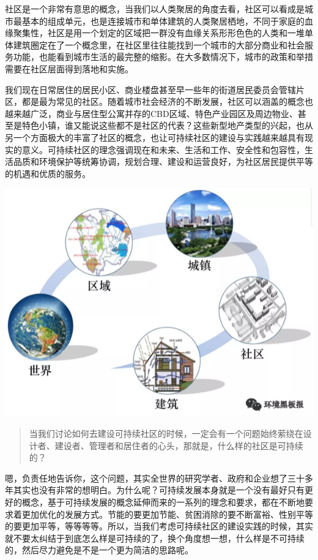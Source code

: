 \documentclass[]{book}
\begin{document}
社区是一个非常有意思的概念，当我们以人类聚居的角度去看，社区可以看成是城市最基本的组成单元，也是连接城市和单体建筑的人类聚居栖地，不同于家庭的血缘聚集性，社区是用一个划定的区域把一群没有血缘关系形形色色的人类和一堆单体建筑圈定在了一个概念里，在社区里往往能找到一个城市的大部分商业和社会服务功能，也能看到城市生活的最完整的缩影。在大多数情况下，城市的政策和举措需要在社区层面得到落地和实施。

我们现在日常居住的居民小区、商业楼盘甚至早一些年的街道居民委员会管辖片区，都是最为常见的社区。随着城市社会经济的不断发展，社区可以涵盖的概念也越来越广泛，商业与居住型公寓并存的CBD区域、特色产业园区及周边物业、甚至是特色小镇，谁又能说这些都不是社区的代表？这些新型地产类型的兴起，也从另一个方面极大的丰富了社区的概念，也让可持续社区的建设与实践越来越具有现实的意义。可持续社区的理念强调现在和未来、生活和工作、安全性和包容性，生活品质和环境保护等统筹协调，规划合理、建设和运营良好，为社区居民提供平等的机遇和优质的服务。

\includegraphics[width=8.33in]{images/moma2}

\begin{quote}
当我们讨论如何去建设可持续社区的时候，一定会有一个问题始终萦绕在设计者、建设者、管理者和居住者的心头，那就是，什么样的社区是可持续的？
\end{quote}

嗯，负责任地告诉你，这个问题，其实全世界的研究学者、政府和企业想了三十多年其实也没有非常的想明白。为什么呢？可持续发展本身就是一个没有最好只有更好的概念，基于可持续发展的概念延伸而来的一系列的理念和要求，都在不断地要求着更加优化的发展方式。节能的要更加节能、贫困消除的要不断富裕、性别平等的要更加平等，等等等等。所以，当我们考虑可持续社区的建设实践的时候，其实就不要太纠结于到底怎么样是可持续的了，换个角度想一想，什么样是不可持续的，然后尽力避免是不是一个更为简洁的思路呢。
\end{document}
